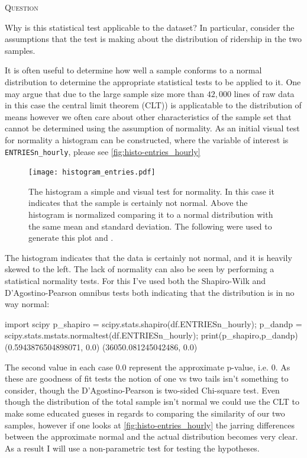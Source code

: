 \documentclass{article}
\newcounter{questionCtr}
\newenvironment{question}{%
   \bigskip\noindent%
   \refstepcounter{questionCtr}%
   \textsc{Question \thequestionCtr}%
   \newline%
   }{\par\bigskip}  %
\numberwithin{questionCtr}{section}
\numberwithin{problemCtr}{section}
\begin{document}
\begin{question}
  Why is this statistical test applicable to the dataset? In particular,
  consider the assumptions that the test is making about the distribution of
  ridership in the two samples.
\end{question}
It is often useful to determine how well a sample conforms to a normal
distribution to determine the appropriate statistical tests to be applied to it.
One may argue that due to the large sample size more than $42,000$ lines of raw
data in this case the central limit theorem (CLT)) is applicatable to the
distribution of means however we often care about other characteristics of the
sample set that cannot be determined using the assumption of normality.  As an
initial visual test for normality a histogram can be constructed, where the
variable of interest is
\verb|ENTRIESn_hourly|, please see \autoref{fig:histo-entries_hourly}

\begin{figure}[ht]
  \centering
  \texttt{[image: histogram\_entries.pdf]}
  \caption{The histogram a simple and visual test for normality.  In this case
    it indicates that the sample is certainly not normal. Above the histogram is
    normalized comparing it to a normal distribution with the same mean and
    standard deviation.  The following were used to generate this plot
    \cite{PANDAS-visualization} and \cite{Stackoverflow-histogram-with-normal}.}
  \label{fig:histo-entries_hourly}
\end{figure}
The histogram indicates that the data is certainly not normal, and it is heavily
skewed to the left.  The lack of normality can also be seen by performing a
statistical normality tests.  For this I've used both the Shapiro-Wilk
\cite{Scipy-shapiro-normaltest} and
D'Agostino-Pearson omnibus \cite{Scipy-mstats-normaltest} tests both indicating
that the distribution is in no way normal:

\begin{python1}
import scipy
p_shapiro = scipy.stats.shapiro(df.ENTRIESn_hourly);
p_dandp = scipy.stats.mstats.normaltest(df.ENTRIESn_hourly);
print(p_shapiro,p_dandp)
(0.5943876504898071, 0.0) (36050.081245042486, 0.0) 
\end{python1}

The second value in each case $0.0$ represent the approximate p-value, i.e. 0.
As these are goodness of fit tests the notion of one vs two tails isn't
something to consider, though the D'Agostino-Pearson is two-sided Chi-square
test.  Even though the distribution of the total sample isn't normal we could
use the CLT to make some educated gueses in regards to comparing the similarity
of our two samples, however if one looks at \autoref{fig:histo-entries_hourly}
the jarring differences between the approximate normal and the actual
distribution becomes very clear.  As a result I will use a non-parametric test
for testing the hypotheses.
\end{document}
